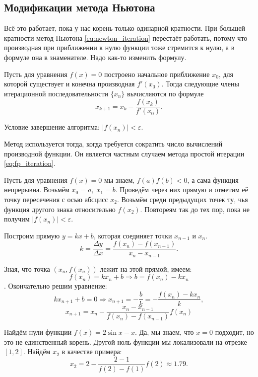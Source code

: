 \documentclass[../main.tex]{subfile}
\begin{document}
\subsection{Модификации метода Ньютона}

Всё это работает, пока у нас корень только одинарной кратности. При большей
кратности метод Ньютона \eqref{eq:newton_iteration} перестаёт работать, потому
что производная при приближении к нулю функции тоже стремится к нулю, а в
формуле она в знаменателе. Надо как-то изменить формулу.

\begin{algorithm}
	Пусть для уравнения $f(x)=0$ построено начальное приближение $x_0$, для
	которой существует и конечна производная $f'(x_0)$. Тогда следующие
	члены итерационной последовательности $\{x_n\}$ вычисляются по формуле
	\[\boxed{x_{k+1}=x_k-\frac{f(x_k)}{f'(x_0)}}.\]

	Условие завершение алгоритма: $|f(x_n)|<\varepsilon$.

	Метод используется тогда, когда требуется сократить число вычислений
	производной функции. Он является частным случаем метода простой
	итерации \eqref{eq:fp_iteration}.
\end{algorithm}

\begin{algorithm}
	Пусть для уравнения $f(x)=0$ мы знаем, $f(a)f(b)<0$, а сама функция
	непрерывна. Возьмём $x_0=a,\;x_1=b$. Проведём через них прямую и отметим
	её точку пересечения с осью абсцисс $x_2$. Возьмём среди предыдущих
	точек ту, чья функция другого знака относительно $f(x_2)$. Повтореям так
	до тех пор, пока не получим $|f(x_n)|<\varepsilon$.

	Построим прямую $y=kx+b$, которая соединяет точки $x_{n-1}$ и $x_n$.
	\[k=\frac{\Delta y}{\Delta x}=\frac{f(x_n)-f(x_{n-1})}{x_n-x_{n-1}}.\]

	Зная, что точка $(x_n,f(x_n))$ лежит на этой прямой, имеем:
	\[f(x_n)=kx_n+b\Rightarrow b=f(x_n)-kx_n\].
	Окончательно решим уравнение:
	\[kx_{n+1}+b=0\Rightarrow x_{n+1}=-\frac{b}{k}=-\frac{f(x_n)-kx_n}{k},\]
	\[\boxed{x_{n+1}=x_n-\frac{x_n-x_{n-1}}{f(x_n)-f(x_{n-1})}f(x_n)}\]
\end{algorithm}

\begin{example}
	Найдём нули функции $f(x)=2\sin x-x$. Да, мы знаем, что $x=0$ подходит,
	но это не единственный корень. Другой ноль функции мы локализовали на
	отрезке $[1,2]$. Найдём $x_2$ в качестве примера:
	\[x_2=2-\frac{2-1}{f(2)-f(1)}f(2)\approx 1.79.\]

	
\end{example}
\end{document}
